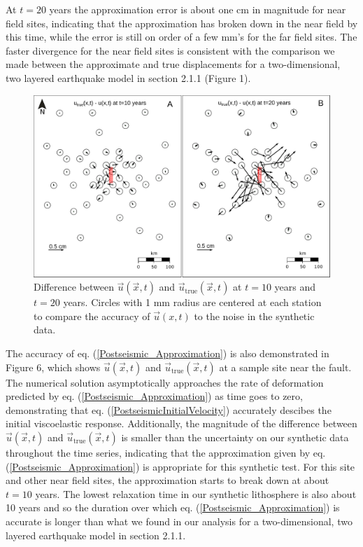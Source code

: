 \documentclass[extra,mreferee]{gji}
\begin{document}
At $t=20$ years the approximation error is about
one cm in magnitude for near field sites, indicating that the
approximation has broken down in the near field by this time, while
the error is still on order of a few mm's for the far field
sites.  The faster divergence for the near field sites is consistent
with the comparison we made between the approximate and true
displacements for a two-dimensional, two layered earthquake model in
section 2.1.1 (Figure 1).

\begin{figure}\label{figure7}
  \centering
  \includegraphics[scale=0.6]{FinalFigures/Figure7.pdf}
  \caption{Difference between $\vec{u}(\vec{x},t)$ and
    $\vec{u}_{\mathrm{true}}(\vec{x},t)$ at $t=10$ years and $t=20$ years.
    Circles with 1 mm radius are centered at each station to compare
    the accuracy of $\vec{u}(x,t)$ to the noise in
    the synthetic data.}
  \label{Figure 7}
\end{figure}

The accuracy of eq. (\ref{Postseismic_Approximation}) is also
demonstrated in Figure 6, which shows $\vec{u}(\vec{x},t)$ and
$\vec{u}_{\mathrm{true}}(\vec{x},t)$ at a sample site near the fault.
The numerical solution asymptotically approaches the rate of
deformation predicted by eq. (\ref{Postseismic_Approximation}) as time
goes to zero, demonstrating that
eq. (\ref{PostseismicInitialVelocity}) accurately descibes the initial
viscoelastic response.  Additionally, the magnitude of the difference
between $\vec{u}(\vec{x},t)$ and $\vec{u}_{\mathrm{true}}(\vec{x},t)$
is smaller than the uncertainty on our synthetic data throughout the
time series, indicating that the approximation given by
eq. (\ref{Postseismic_Approximation}) is appropriate for this
synthetic test.  For this site and other near field sites, the
approximation starts to break down at about $t=10$ years. The lowest
relaxation time in our synthetic lithosphere is also about 10 years
and so the duration over which eq. (\ref{Postseismic_Approximation})
is accurate is longer than what we found in our analysis for a
two-dimensional, two layered earthquake model in section 2.1.1. 
\end{document}
